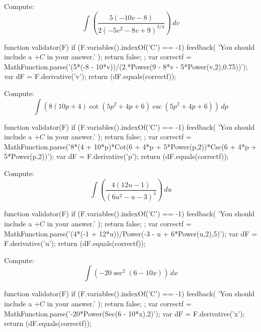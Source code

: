\documentclass{ximera}
\renewcommand{\d}{\, d}
\begin{document}
\begin{exercise}
Compute: 
\[
\int \left(\frac{5 (-10 v-8)}{2 \left(-5 v^2-8 v+9\right)^{3/4}}\right)\d v
\]
\begin{expressionAnswer}
     function validator(F) {
      if (F.variables().indexOf('C') == -1) {
        feedback( 'You should include a $+C$ in your answer.' );
        return false;
      };      
      var correctf = MathFunction.parse('(5*(-8 - 10*v))/(2.*Power(9 - 8*v - 5*Power(v,2),0.75))');
      var dF = F.derivative('v');
      return (dF.equals(correctf));
    }
\end{expressionAnswer}
\end{exercise}



\begin{exercise}
Compute: 
\[
\int \left(8 (10 p+4) \cot \left(5 p^2+4 p+6\right) \csc \left(5 p^2+4 p+6\right)\right)\d p
\]
\begin{expressionAnswer}
     function validator(F) {
      if (F.variables().indexOf('C') == -1) {
        feedback( 'You should include a $+C$ in your answer.' );
        return false;
      };      
      var correctf = MathFunction.parse('8*(4 + 10*p)*Cot(6 + 4*p + 5*Power(p,2))*Csc(6 + 4*p + 5*Power(p,2))');
      var dF = F.derivative('p');
      return (dF.equals(correctf));
    }
\end{expressionAnswer}
\end{exercise}



\begin{exercise}
Compute: 
\[
\int \left(\frac{4 (12 u-1)}{\left(6 u^2-u-3\right)^5}\right)\d u
\]
\begin{expressionAnswer}
     function validator(F) {
      if (F.variables().indexOf('C') == -1) {
        feedback( 'You should include a $+C$ in your answer.' );
        return false;
      };      
      var correctf = MathFunction.parse('(4*(-1 + 12*u))/Power(-3 - u + 6*Power(u,2),5)');
      var dF = F.derivative('u');
      return (dF.equals(correctf));
    }
\end{expressionAnswer}
\end{exercise}



\begin{exercise}
Compute: 
\[
\int \left(-20 \sec ^2(6-10 x)\right)\d x
\]
\begin{expressionAnswer}
     function validator(F) {
      if (F.variables().indexOf('C') == -1) {
        feedback( 'You should include a $+C$ in your answer.' );
        return false;
      };      
      var correctf = MathFunction.parse('-20*Power(Sec(6 - 10*x),2)');
      var dF = F.derivative('x');
      return (dF.equals(correctf));
    }
\end{expressionAnswer}
\end{exercise}
\end{document}

